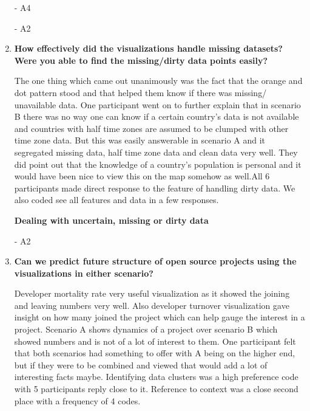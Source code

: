 \documentclass[double,12pt]{beavtex}
\begin{document}
\begin{enumerate}
{\em {}} - A4

{\em {}} - A2

\item \textbf{How effectively did the visualizations handle missing datasets? Were you able to find the missing/dirty data points easily?}

The one thing which came out unanimously was the fact that the orange and dot pattern stood and that helped them know if there was missing/ unavailable data. One participant went on to further explain that in scenario B there was no way one can know if a certain country's data is not available and countries with half time zones are assumed to be clumped with other time zone data. But this was easily answerable in scenario A and it segregated missing data, half time zone data and clean data very well. They did point out that the knowledge of a country's population is personal and it would have been nice to view this on the map somehow as well.All 6 participants made direct response to the feature of handling dirty data. We also coded see all features and data in a few responses.

\textbf{Dealing with uncertain, missing or dirty data}

{\em {}} - A2

\item \textbf{Can we predict future structure of open source projects using the visualizations in either scenario?}

Developer mortality rate very useful visualization as it showed the joining and leaving numbers very well. Also developer turnover visualization gave insight on how many joined the project which can help gauge the interest in a project. Scenario A shows dynamics of a project over scenario B which showed numbers and is not of a lot of interest to them. One participant felt that both scenarios had something to offer with A being on the higher end, but if they were to be combined and viewed that would add a lot of interesting facts maybe. Identifying data clusters was a high preference code with 5 participants reply close to it. Reference to context was a close second place with a frequency of 4 codes.


\end{enumerate}
\end{document}
